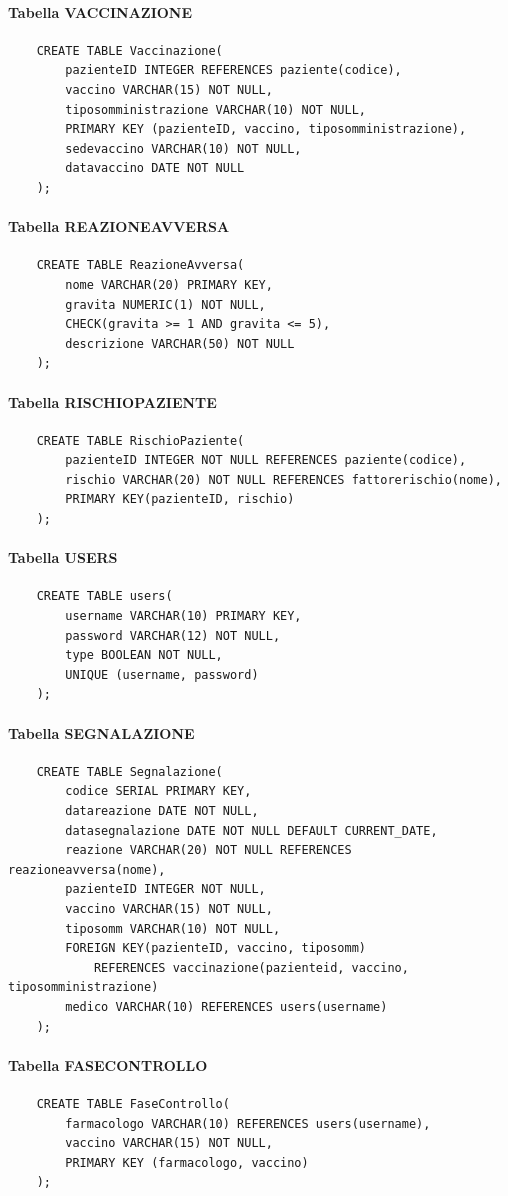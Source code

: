\documentclass{article}
\begin{document}
\paragraph*{Tabella VACCINAZIONE}
\begin{verbatim}
    CREATE TABLE Vaccinazione(
        pazienteID INTEGER REFERENCES paziente(codice),
        vaccino VARCHAR(15) NOT NULL,
        tiposomministrazione VARCHAR(10) NOT NULL,
        PRIMARY KEY (pazienteID, vaccino, tiposomministrazione),
        sedevaccino VARCHAR(10) NOT NULL,
        datavaccino DATE NOT NULL
    );
\end{verbatim}

\paragraph*{Tabella REAZIONEAVVERSA}
\begin{verbatim}
    CREATE TABLE ReazioneAvversa(
        nome VARCHAR(20) PRIMARY KEY,
        gravita NUMERIC(1) NOT NULL,
        CHECK(gravita >= 1 AND gravita <= 5),
        descrizione VARCHAR(50) NOT NULL
    );
\end{verbatim}

\paragraph*{Tabella RISCHIOPAZIENTE}
\begin{verbatim}
    CREATE TABLE RischioPaziente(
        pazienteID INTEGER NOT NULL REFERENCES paziente(codice),
        rischio VARCHAR(20) NOT NULL REFERENCES fattorerischio(nome),
        PRIMARY KEY(pazienteID, rischio)
    );
\end{verbatim}

\paragraph*{Tabella USERS}
\begin{verbatim}
    CREATE TABLE users(
        username VARCHAR(10) PRIMARY KEY,
        password VARCHAR(12) NOT NULL,
        type BOOLEAN NOT NULL,
        UNIQUE (username, password)
    );
\end{verbatim}

\paragraph*{Tabella SEGNALAZIONE}
\begin{verbatim}
    CREATE TABLE Segnalazione(
        codice SERIAL PRIMARY KEY,
        datareazione DATE NOT NULL,
        datasegnalazione DATE NOT NULL DEFAULT CURRENT_DATE,
        reazione VARCHAR(20) NOT NULL REFERENCES reazioneavversa(nome),
        pazienteID INTEGER NOT NULL,
        vaccino VARCHAR(15) NOT NULL,
        tiposomm VARCHAR(10) NOT NULL,
        FOREIGN KEY(pazienteID, vaccino, tiposomm) 
            REFERENCES vaccinazione(pazienteid, vaccino, tiposomministrazione)
        medico VARCHAR(10) REFERENCES users(username)
    );
\end{verbatim}

\paragraph*{Tabella FASECONTROLLO} 
\begin{verbatim}
    CREATE TABLE FaseControllo(
        farmacologo VARCHAR(10) REFERENCES users(username),
        vaccino VARCHAR(15) NOT NULL,
        PRIMARY KEY (farmacologo, vaccino)
    );
\end{verbatim}
\end{document}
